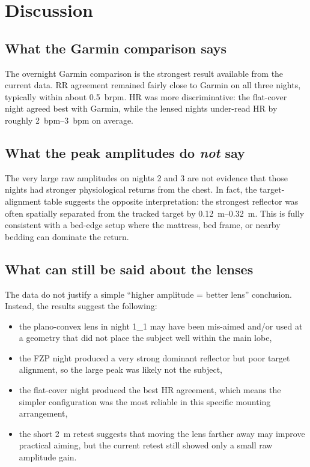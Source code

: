\documentclass[11pt,a4paper]{article}
\begin{document}
\section{Discussion}
\subsection{What the Garmin comparison says}
The overnight Garmin comparison is the strongest result available from the current data. RR agreement remained fairly close to Garmin on all three nights, typically within about \SI{0.5}{brpm}. HR was more discriminative: the flat-cover night agreed best with Garmin, while the lensed nights under-read HR by roughly \SIrange{2}{3}{bpm} on average.

\subsection{What the peak amplitudes do \emph{not} say}
The very large raw amplitudes on nights 2 and 3 are not evidence that those nights had stronger physiological returns from the chest. In fact, the target-alignment table suggests the opposite interpretation: the strongest reflector was often spatially separated from the tracked target by \SIrange{0.12}{0.32}{m}. This is fully consistent with a bed-edge setup where the mattress, bed frame, or nearby bedding can dominate the return.

\subsection{What can still be said about the lenses}
The data do not justify a simple ``higher amplitude = better lens'' conclusion. Instead, the results suggest the following:
\begin{itemize}
    \item the plano-convex lens in night 1\_1 may have been mis-aimed and/or used at a geometry that did not place the subject well within the main lobe,
    \item the FZP night produced a very strong dominant reflector but poor target alignment, so the large peak was likely not the subject,
    \item the flat-cover night produced the best HR agreement, which means the simpler configuration was the most reliable in this specific mounting arrangement,
    \item the short \SI{2}{m} retest suggests that moving the lens farther away may improve practical aiming, but the current retest still showed only a small raw amplitude gain.
\end{itemize}
\end{document}
